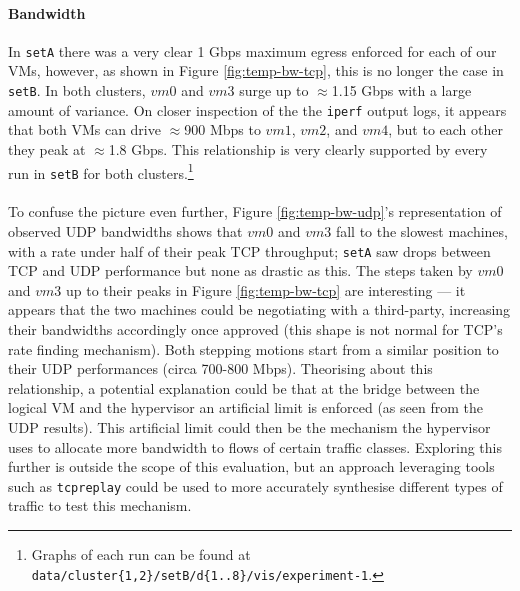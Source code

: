 \documentclass[a4paper,10pt]{article}
\begin{document}
\paragraph{Bandwidth} In \texttt{setA} there was a very clear 1 Gbps maximum egress enforced for each of our VMs, however, as shown in Figure \ref{fig:temp-bw-tcp}, this is no longer the case in \texttt{setB}. In both clusters, $vm0$ and $vm3$ surge up to $\approx$1.15 Gbps with a large amount of variance. On closer inspection of the the \texttt{iperf} output logs, it appears that both VMs can drive $\approx$900 Mbps to $vm1$, $vm2$, and $vm4$, but to each other they peak at $\approx$1.8 Gbps. This relationship is very clearly supported by every run in \texttt{setB} for both clusters.\footnote{Graphs of each run can be found at \texttt{data/cluster\{1,2\}/setB/d\{1..8\}/vis/experiment-1}.}

\paragraph{} To confuse the picture even further, Figure \ref{fig:temp-bw-udp}'s representation of observed UDP bandwidths shows that $vm0$ and $vm3$ fall to the slowest machines, with a rate under half of their peak TCP throughput; \texttt{setA} saw drops between TCP and UDP performance but none as drastic as this. The steps taken by $vm0$ and $vm3$ up to their peaks in Figure \ref{fig:temp-bw-tcp} are interesting --- it appears that the two machines could be negotiating with a third-party, increasing their bandwidths accordingly once approved (this shape is not normal for TCP's rate finding mechanism). Both stepping motions start from a similar position to their UDP performances (circa 700-800 Mbps). Theorising about this relationship, a potential explanation could be that at the bridge between the logical VM and the hypervisor an artificial limit is enforced (as seen from the UDP results). This artificial limit could then be the mechanism the hypervisor uses to allocate more bandwidth to flows of certain traffic classes. Exploring this further is outside the scope of this evaluation, but an approach leveraging tools such as \texttt{tcpreplay} could be used to more accurately synthesise different types of traffic to test this mechanism.
\end{document}
